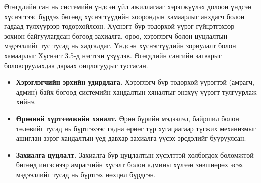 Өгөгдлийн сан нь системийн үндсэн үйл ажиллагааг хэрэгжүүлэх долоон үндсэн хүснэгтээс бүрдэх бөгөөд хүснэгтүүдийн хоорондын хамаарлыг анхдагч болон гадаад түлхүүрээр тодорхойлсон. Хүснэгт бүр тодорхой үүрэг гүйцэтгэхээр зохион байгуулагдсан бөгөөд захиалга, өрөө, хэрэглэгч болон цуцлалтын мэдээллийг тус тусад нь хадгалдаг. Үндсэн хүснэгтүүдийн зориулалт болон хамаарлыг Хүснэгт 3.5-д нэгтгэн үзүүлэв. Өгөгдлийн сангийн загварыг боловсруулахдаа дараах онцлогуудыг тусгасан.
\begin{itemize}
    \item \textbf{Хэрэглэгчийн эрхийн удирдлага.} Хэрэглэгч бүр тодорхой үүрэгтэй (амрагч, админ) байх бөгөөд системийн хандалтын хяналтыг энэхүү үүрэгт тулгуурлаж хийнэ.

    \item \textbf{Өрөөний хүртээмжийн хяналт.} Өрөө бүрийн мэдээлэл, байршил болон төлөвийг тусад нь бүртгэхээс гадна өрөөг түр хугацаагаар түгжих механизмыг ашиглан зэрэг хандалтын үед давхар захиалга үүсэх эрсдэлийг бууруулсан.

    \item \textbf{Захиалга цуцлалт.} Захиалга бүр цуцлалтын хүсэлттэй холбогдох боломжтой бөгөөд ингэснээр амрагчийн хүсэлт болон админы хүлээн зөвшөөрөх эсэх мэдээллийг тусад нь бүртгэх нөхцөл бүрдсэн.
\end{itemize}
